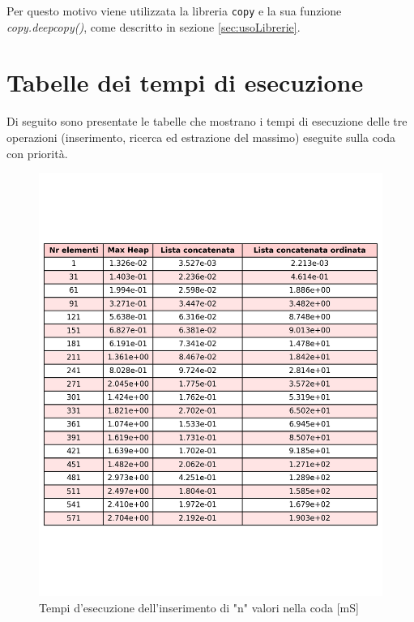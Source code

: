 \documentclass{article}
\begin{document}
Per questo motivo viene utilizzata la libreria \verb|copy| e la sua funzione \textit{copy.deepcopy()}, come descritto in sezione \ref{sec:usoLibrerie}.

\clearpage

\section{Tabelle dei tempi di esecuzione}

\label{sec:tabelleTempi}

Di seguito sono presentate le tabelle che mostrano i tempi di esecuzione delle tre operazioni (inserimento, ricerca ed estrazione del massimo) eseguite sulla coda con priorità.

\begin{figure}[H]
    \centering
    \includegraphics[width=\textwidth]{Images/TempoInserimento.png}
    \caption{Tempi d'esecuzione dell'inserimento di "n" valori nella coda [mS]}
    \label{fig:TabellaInserimento}
\end{figure}
\end{document}
